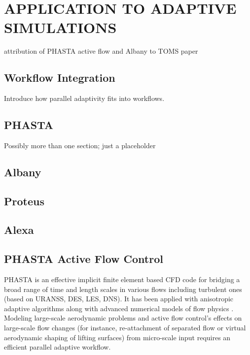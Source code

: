 
\chapter{APPLICATION TO ADAPTIVE SIMULATIONS}
\label{chap:apps}

{\color{red} attribution of PHASTA active flow and Albany to TOMS paper}

\section{Workflow Integration}

Introduce how parallel adaptivity fits into workflows.

\section{PHASTA}

Possibly more than one section; just a placeholder

\section{Albany}

\section{Proteus}

\section{Alexa}

\section{PHASTA Active Flow Control}

PHASTA \cite{JanWhi99,WhiJanDey2003} is an effective implicit finite element
based CFD code for bridging a broad range of time and length scales in various
flows including turbulent ones (based on URANSS, DES, LES, DNS). It has been
applied with anisotropic adaptive algorithms \cite{Sahn06,Sahn07,Sahn08,
ovcharenko2013parallel}
along with advanced numerical models of flow physics
\cite{HugLES99,TeJaSUPG,TeJaDFWR2}. Modeling large-scale aerodynamic problems
and active flow control's effects on large-scale flow changes (for instance,
re-attachment of separated flow or virtual aerodynamic shaping of lifting
surfaces) from micro-scale input \cite{Amitay:98,Glezer:02,Sahni:11} requires an
efficient parallel adaptive workflow.

